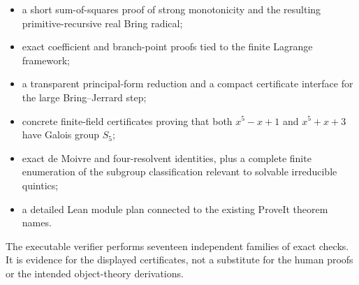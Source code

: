 \begin{itemize}
\item a short sum-of-squares proof of strong monotonicity and the resulting
      primitive-recursive real Bring radical;
\item exact coefficient and branch-point proofs tied to the finite Lagrange
      framework;
\item a transparent principal-form reduction and a compact certificate
      interface for the large Bring--Jerrard step;
\item concrete finite-field certificates proving that both
      \(x^5-x+1\) and \(x^5+x+3\) have Galois group \(S_5\);
\item exact de Moivre and four-resolvent identities, plus a complete finite
      enumeration of the subgroup classification relevant to solvable
      irreducible quintics;
\item a detailed Lean module plan connected to the existing ProveIt theorem
      names.
\end{itemize}

The executable verifier performs seventeen independent families of exact
checks.  It is evidence for the displayed certificates, not a substitute for
the human proofs or the intended object-theory derivations.
